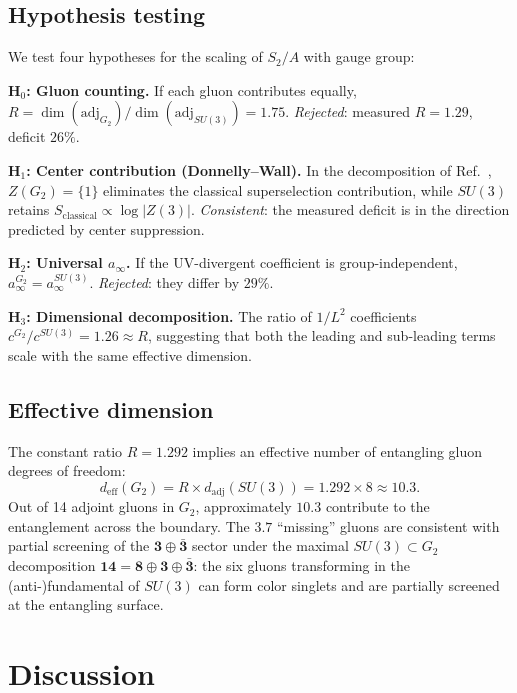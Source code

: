 \documentclass[twocolumn,prd,nofootinbib]{revtex4-2}
\begin{document}
\subsection{Hypothesis testing}

We test four hypotheses for the scaling of $S_2/A$ with gauge group:

\textbf{H$_0$: Gluon counting.} If each gluon contributes equally, $R = \dim(\mathrm{adj}_{G_2})/\dim(\mathrm{adj}_{SU(3)}) = 1.75$. \emph{Rejected}: measured $R = 1.29$, deficit $26\%$.

\textbf{H$_1$: Center contribution (Donnelly--Wall).} In the decomposition of Ref.~\cite{Donnelly2012}, $Z(G_2) = \{1\}$ eliminates the classical superselection contribution, while $SU(3)$ retains $S_{\mathrm{classical}} \propto \log|Z(3)|$. \emph{Consistent}: the measured deficit is in the direction predicted by center suppression.

\textbf{H$_2$: Universal $a_\infty$.} If the UV-divergent coefficient is group-independent, $a_\infty^{G_2} = a_\infty^{SU(3)}$. \emph{Rejected}: they differ by $29\%$.

\textbf{H$_3$: Dimensional decomposition.} The ratio of $1/L^2$ coefficients $c^{G_2}/c^{SU(3)} = 1.26 \approx R$, suggesting that both the leading and sub-leading terms scale with the same effective dimension.

\subsection{Effective dimension}

The constant ratio $R = 1.292$ implies an effective number of entangling gluon degrees of freedom:
\begin{equation}
d_{\mathrm{eff}}(G_2) = R \times d_{\mathrm{adj}}(SU(3)) = 1.292 \times 8 \approx 10.3.
\end{equation}
Out of 14 adjoint gluons in $G_2$, approximately $10.3$ contribute to the entanglement across the boundary. The $3.7$ ``missing'' gluons are consistent with partial screening of the $\mathbf{3} \oplus \bar{\mathbf{3}}$ sector under the maximal $SU(3) \subset G_2$ decomposition $\mathbf{14} = \mathbf{8} \oplus \mathbf{3} \oplus \bar{\mathbf{3}}$: the six gluons transforming in the (anti-)fundamental of $SU(3)$ can form color singlets and are partially screened at the entangling surface.

\section{Discussion}
\end{document}
